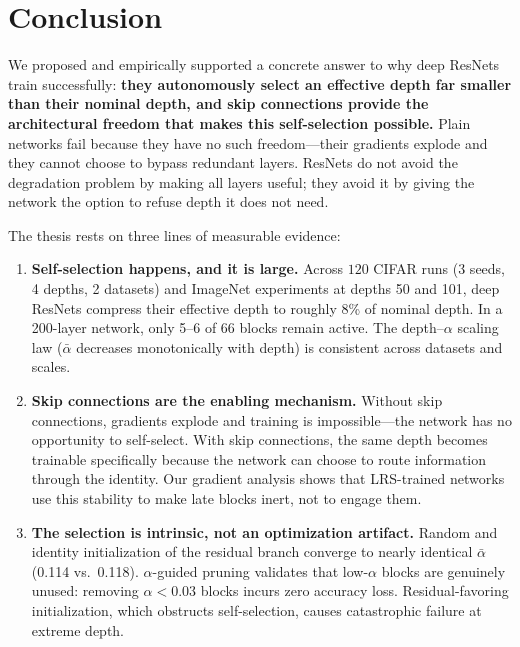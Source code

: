 \documentclass[preprint,12pt]{elsarticle}
\begin{document}
\section{Conclusion}
\label{sec:conclusion}

We proposed and empirically supported a concrete answer to why deep ResNets train successfully: \textbf{they autonomously select an effective depth far smaller than their nominal depth, and skip connections provide the architectural freedom that makes this self-selection possible.} Plain networks fail because they have no such freedom---their gradients explode and they cannot choose to bypass redundant layers. ResNets do not avoid the degradation problem by making all layers useful; they avoid it by giving the network the option to refuse depth it does not need.

The thesis rests on three lines of measurable evidence:

\begin{enumerate}
    \item \textbf{Self-selection happens, and it is large.} Across $120$ CIFAR runs (3 seeds, 4 depths, 2 datasets) and ImageNet experiments at depths 50 and 101, deep ResNets compress their effective depth to roughly 8\% of nominal depth. In a 200-layer network, only 5--6 of 66 blocks remain active. The depth--$\alpha$ scaling law ($\bar{\alpha}$ decreases monotonically with depth) is consistent across datasets and scales.
    \item \textbf{Skip connections are the enabling mechanism.} Without skip connections, gradients explode and training is impossible---the network has no opportunity to self-select. With skip connections, the same depth becomes trainable specifically because the network can choose to route information through the identity. Our gradient analysis shows that LRS-trained networks use this stability to make late blocks inert, not to engage them.
    \item \textbf{The selection is intrinsic, not an optimization artifact.} Random and identity initialization of the residual branch converge to nearly identical $\bar{\alpha}$ (0.114 vs.\ 0.118). $\alpha$-guided pruning validates that low-$\alpha$ blocks are genuinely unused: removing $\alpha < 0.03$ blocks incurs zero accuracy loss. Residual-favoring initialization, which obstructs self-selection, causes catastrophic failure at extreme depth.
\end{enumerate}
\end{document}
